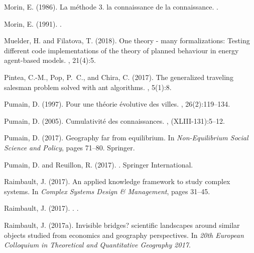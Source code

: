 \begin{thebibliography}{}
Morin, E. (1986).
\newblock La m{\'e}thode 3. la connaissance de la connaissance.
.

Morin, E. (1991).
.

Muelder, H. and Filatova, T. (2018).
\newblock One theory - many formalizations: Testing different code
  implementations of the theory of planned behaviour in energy agent-based
  models.
, 21(4):5.

Pintea, C.-M., Pop, P.~C., and Chira, C. (2017).
\newblock The generalized traveling salesman problem solved with ant
  algorithms.
, 5(1):8.

Pumain, D. (1997).
\newblock Pour une th{\'e}orie {\'e}volutive des villes.
, 26(2):119--134.

Pumain, D. (2005).
\newblock Cumulativit{\'e} des connaissances.
, (XLIII-131):5--12.

Pumain, D. (2017).
\newblock Geography far from equilibrium.
\newblock In {\em Non-Equilibrium Social Science and Policy}, pages 71--80.
  Springer.

Pumain, D. and Reuillon, R. (2017).
.
\newblock Springer International.

Raimbault, J. (2017).
\newblock An applied knowledge framework to study complex systems.
\newblock In {\em Complex Systems Design \& Management}, pages 31--45.

{Raimbault}, J. (2017).
.
.

Raimbault, J. (2017a).
\newblock Invisible bridges? scientific landscapes around similar objects
  studied from economics and geography perspectives.
\newblock In {\em 20th European Colloquium in Theoretical and Quantitative
  Geography 2017}.


\end{thebibliography}
